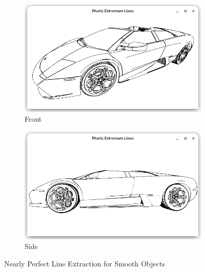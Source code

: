 \documentclass[9pt,fleqn,twoside,twocolumn]{stdglobal}
\begin{document}
  \begin{figure}
    \centering
    \begin{subfigure}[b]{\linewidth}
      \centering
      \includegraphics[width=\textwidth,trim={15px 15 15 50},clip]{images/lamborghini-front.png}
      \caption{Front}
    \end{subfigure}
    \begin{subfigure}[b]{\linewidth}
      \centering
      \includegraphics[width=\textwidth,trim={15px 15 15 50},clip]{images/lamborghini-side.png}
      \caption{Side}
    \end{subfigure}
    \caption{Nearly Perfect Line Extraction for Smooth Objects}
  \end{figure}
\end{document}
